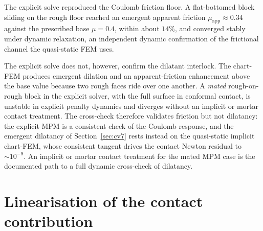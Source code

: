 \documentclass{svjour3}                 %
\newcommand{\muapp}{\mu_{\mathrm{app}}}
\begin{document}
\begin{appendix}
The explicit solve reproduced the Coulomb friction floor. A flat-bottomed block sliding on the rough floor
reached an emergent apparent friction $\muapp\approx0.34$ against the prescribed base $\mu=0.4$, within
about $14\%$, and converged stably under dynamic relaxation, an independent dynamic confirmation
of the frictional channel the quasi-static FEM uses.

The explicit solve does not, however, confirm the dilatant interlock. The chart-FEM produces emergent
dilation and an apparent-friction enhancement above the base value because two rough faces ride over one
another. A \emph{mated} rough-on-rough block in the explicit solver, with the full surface in conformal
contact, is unstable in explicit penalty dynamics and diverges without an implicit or mortar contact
treatment. The cross-check therefore validates friction but not dilatancy: the explicit MPM is a consistent check of the Coulomb response, and the emergent dilatancy
of Section~\ref{sec:cv7} rests instead on the quasi-static implicit chart-FEM, whose consistent tangent
drives the contact Newton residual to $\sim10^{-9}$. An implicit or mortar contact treatment for the
mated MPM case is the documented path to a full dynamic cross-check of dilatancy.

\section{Linearisation of the contact contribution}\label{app:linearisation}


\end{appendix}
\end{document}
